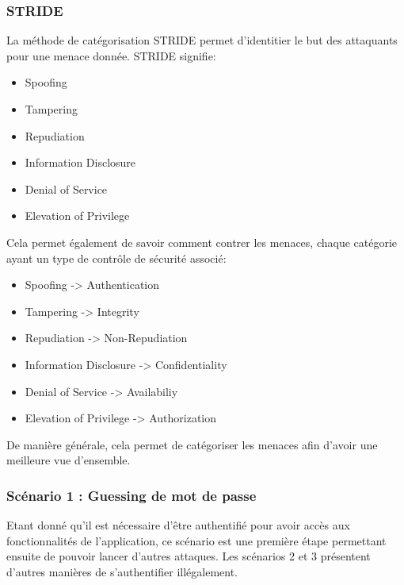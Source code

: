 \documentclass{article}
\begin{document}
\hypertarget{stride}{%
\subsubsection{STRIDE}\label{stride}}

La méthode de catégorisation STRIDE permet d'identitier le but des
attaquants pour une menace donnée. STRIDE signifie:

\begin{itemize}
\tightlist
\item
  Spoofing
\item
  Tampering
\item
  Repudiation
\item
  Information Disclosure
\item
  Denial of Service
\item
  Elevation of Privilege
\end{itemize}

Cela permet également de savoir comment contrer les menaces, chaque
catégorie ayant un type de contrôle de sécurité associé:

\begin{itemize}
\tightlist
\item
  Spoofing -\textgreater{} Authentication
\item
  Tampering -\textgreater{} Integrity
\item
  Repudiation -\textgreater{} Non-Repudiation
\item
  Information Disclosure -\textgreater{} Confidentiality
\item
  Denial of Service -\textgreater{} Availabiliy
\item
  Elevation of Privilege -\textgreater{} Authorization
\end{itemize}

De manière générale, cela permet de catégoriser les menaces afin d'avoir
une meilleure vue d'ensemble.

\hypertarget{scuxe9nario-1-guessing-de-mot-de-passe}{%
\subsubsection{Scénario 1 : Guessing de mot de
passe}\label{scuxe9nario-1-guessing-de-mot-de-passe}}

Etant donné qu'il est nécessaire d'être authentifié pour avoir accès aux
fonctionnalités de l'application, ce scénario est une première étape
permettant ensuite de pouvoir lancer d'autres attaques. Les scénarios 2
et 3 présentent d'autres manières de s'authentifier illégalement.
\end{document}
